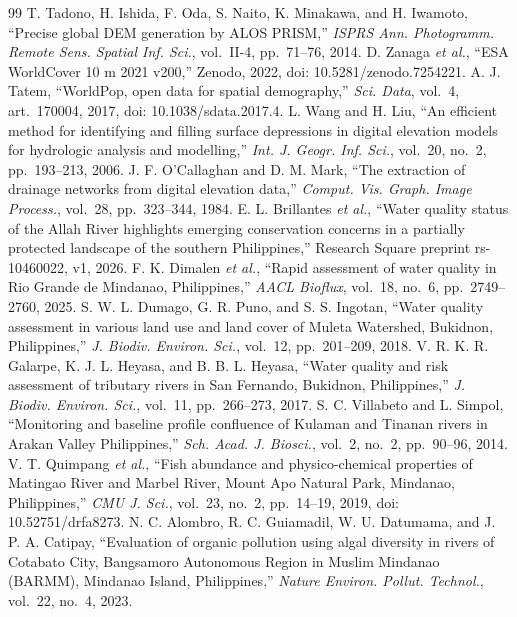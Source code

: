 \documentclass[10pt,twocolumn,letterpaper]{article}
\begin{document}
\begin{thebibliography}{99}
 T. Tadono, H. Ishida, F. Oda, S. Naito, K. Minakawa, and H. Iwamoto, ``Precise global DEM generation by ALOS PRISM,'' \textit{ISPRS Ann. Photogramm. Remote Sens. Spatial Inf. Sci.}, vol.~II-4, pp.~71--76, 2014.
 D. Zanaga \textit{et al.}, ``ESA WorldCover 10 m 2021 v200,'' Zenodo, 2022, doi: 10.5281/zenodo.7254221.
 A. J. Tatem, ``WorldPop, open data for spatial demography,'' \textit{Sci. Data}, vol.~4, art.~170004, 2017, doi: 10.1038/sdata.2017.4.
 L. Wang and H. Liu, ``An efficient method for identifying and filling surface depressions in digital elevation models for hydrologic analysis and modelling,'' \textit{Int. J. Geogr. Inf. Sci.}, vol.~20, no.~2, pp.~193--213, 2006.
 J. F. O'Callaghan and D. M. Mark, ``The extraction of drainage networks from digital elevation data,'' \textit{Comput. Vis. Graph. Image Process.}, vol.~28, pp.~323--344, 1984.
 E. L. Brillantes \textit{et al.}, ``Water quality status of the Allah River highlights emerging conservation concerns in a partially protected landscape of the southern Philippines,'' Research Square preprint rs-10460022, v1, 2026.
 F. K. Dimalen \textit{et al.}, ``Rapid assessment of water quality in Rio Grande de Mindanao, Philippines,'' \textit{AACL Bioflux}, vol.~18, no.~6, pp.~2749--2760, 2025.
 S. W. L. Dumago, G. R. Puno, and S. S. Ingotan, ``Water quality assessment in various land use and land cover of Muleta Watershed, Bukidnon, Philippines,'' \textit{J. Biodiv. Environ. Sci.}, vol.~12, pp.~201--209, 2018.
 V. R. K. R. Galarpe, K. J. L. Heyasa, and B. B. L. Heyasa, ``Water quality and risk assessment of tributary rivers in San Fernando, Bukidnon, Philippines,'' \textit{J. Biodiv. Environ. Sci.}, vol.~11, pp.~266--273, 2017.
 S. C. Villabeto and L. Simpol, ``Monitoring and baseline profile confluence of Kulaman and Tinanan rivers in Arakan Valley Philippines,'' \textit{Sch. Acad. J. Biosci.}, vol.~2, no.~2, pp.~90--96, 2014.
 V. T. Quimpang \textit{et al.}, ``Fish abundance and physico-chemical properties of Matingao River and Marbel River, Mount Apo Natural Park, Mindanao, Philippines,'' \textit{CMU J. Sci.}, vol.~23, no.~2, pp.~14--19, 2019, doi: 10.52751/drfa8273.
 N. C. Alombro, R. C. Guiamadil, W. U. Datumama, and J. P. A. Catipay, ``Evaluation of organic pollution using algal diversity in rivers of Cotabato City, Bangsamoro Autonomous Region in Muslim Mindanao (BARMM), Mindanao Island, Philippines,'' \textit{Nature Environ. Pollut. Technol.}, vol.~22, no.~4, 2023.

\end{thebibliography}
\end{document}
